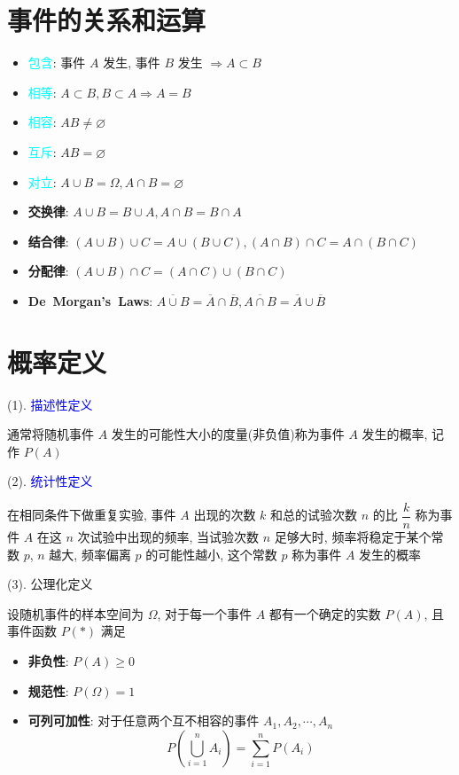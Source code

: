 \section{事件的关系和运算}
\begin{definition}[事件间关系]
	\begin{itemize}
		\item \textcolor{cyan}{包含}: 事件 $A$ 发生, 事件 $B$ 发生 $\Rightarrow A\subset B$
		\item \textcolor{cyan}{相等}: $A \subset B, B\subset A\Rightarrow A = B$
		\item \textcolor{cyan}{相容}: $AB \neq \varnothing$
		\item \textcolor{cyan}{互斥}: $AB = \varnothing$
		\item \textcolor{cyan}{对立}: $A\cup B=\Omega, A\cap B =\varnothing$
	\end{itemize}
\end{definition}
\begin{definition}[运算法则]
	\begin{itemize}
		\item \textbf{交换律}: $A \cup B = B \cup A, A \cap B = B \cap A$
		\item \textbf{结合律}: $(A\cup B)\cup C = A\cup (B\cup C), (A\cap B)\cap C = A\cap (B\cap C)$
		\item \textbf{分配律}: $(A\cup B)\cap C = (A\cap C)\cup (B\cap C)$
		\item \textbf{De\ Morgan's\ Laws}: $\overline{A\cup B} = \overline{A}\cap\overline{B}, \overline{A\cap B} = \overline{A}\cup\overline{B}$
	\end{itemize}
\end{definition}

\section{概率定义}
\begin{definition}[概率定义]
	(1). \textcolor{blue}{描述性定义}
	
	通常将随机事件 $A$ 发生的可能性大小的度量(非负值)称为事件 $A$ 发生的概率, 记作 $P(A)$
	
	(2). \textcolor{blue}{统计性定义}
	
	在相同条件下做重复实验, 事件 $A$ 出现的次数 $k$ 和总的试验次数 $n$ 的比 $\dfrac{k}{n}$ 称为事件 $A$ 在这 $n$ 次试验中出现的频率, 
	当试验次数 $n$ 足够大时, 频率将稳定于某个常数 $p$, $n$ 越大, 频率偏离 $p$ 的可能性越小, 这个常数 $p$ 称为事件 $A$ 发生的概率
	
	(3). 公理化定义
	
	设随机事件的样本空间为 $\Omega$, 对于每一个事件 $A$ 都有一个确定的实数 $P(A)$, 且事件函数 $P(*)$ 满足 
	\begin{itemize}
		\item \textbf{非负性}: $P(A) \geq 0$
		\item \textbf{规范性}: $P(\Omega) = 1$
		\item \textbf{可列可加性}: 对于任意两个互不相容的事件 $A_{1}, A_{2}, \cdots, A_{n}$
		$$P(\bigcup_{i = 1}^{n}A_{i}) = \sum\limits_{i=1}^{n}P(A_{i})$$
	\end{itemize}
\end{definition}

